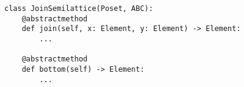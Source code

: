 \par\begin{minipage}{60ex}
\begin{verbatim}
class JoinSemilattice(Poset, ABC):
    @abstractmethod
    def join(self, x: Element, y: Element) -> Element:
        ...

    @abstractmethod
    def bottom(self) -> Element:
        ...
\end{verbatim}
\end{minipage}\par